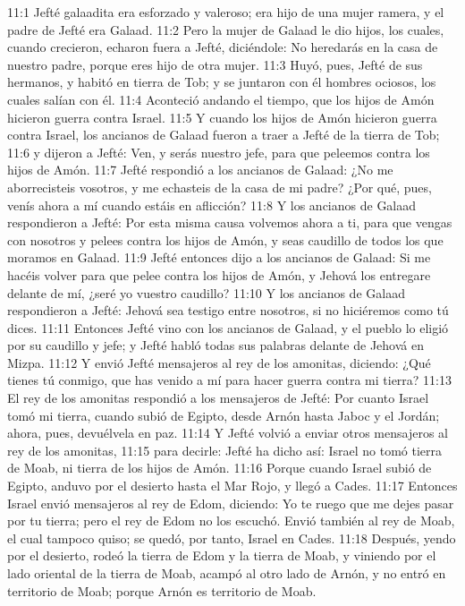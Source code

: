 11:1 Jefté galaadita era esforzado y valeroso; era hijo de una mujer ramera, y el padre de Jefté era Galaad.  
11:2 Pero la mujer de Galaad le dio hijos, los cuales, cuando crecieron, echaron fuera a Jefté, diciéndole: No heredarás en la casa de nuestro padre, porque eres hijo de otra mujer.  
11:3 Huyó, pues, Jefté de sus hermanos, y habitó en tierra de Tob; y se juntaron con él hombres ociosos, los cuales salían con él.  
11:4 Aconteció andando el tiempo, que los hijos de Amón hicieron guerra contra Israel.  
11:5 Y cuando los hijos de Amón hicieron guerra contra Israel, los ancianos de Galaad fueron a traer a Jefté de la tierra de Tob; 
11:6 y dijeron a Jefté: Ven, y serás nuestro jefe, para que peleemos contra los hijos de Amón.  
11:7 Jefté respondió a los ancianos de Galaad: ¿No me aborrecisteis vosotros, y me echasteis de la casa de mi padre? ¿Por qué, pues, venís ahora a mí cuando estáis en aflicción?  
11:8 Y los ancianos de Galaad respondieron a Jefté: Por esta misma causa volvemos ahora a ti, para que vengas con nosotros y pelees contra los hijos de Amón, y seas caudillo de todos los que moramos en Galaad.  
11:9 Jefté entonces dijo a los ancianos de Galaad: Si me hacéis volver para que pelee contra los hijos de Amón, y Jehová los entregare delante de mí, ¿seré yo vuestro caudillo?  
11:10 Y los ancianos de Galaad respondieron a Jefté: Jehová sea testigo entre nosotros, si no hiciéremos como tú dices.  
11:11 Entonces Jefté vino con los ancianos de Galaad, y el pueblo lo eligió por su caudillo y jefe; y Jefté habló todas sus palabras delante de Jehová en Mizpa.  
11:12 Y envió Jefté mensajeros al rey de los amonitas, diciendo: ¿Qué tienes tú conmigo, que has venido a mí para hacer guerra contra mi tierra?  
11:13 El rey de los amonitas respondió a los mensajeros de Jefté: Por cuanto Israel tomó mi tierra, cuando subió de Egipto, desde Arnón hasta Jaboc y el Jordán; ahora, pues, devuélvela en paz.  
11:14 Y Jefté volvió a enviar otros mensajeros al rey de los amonitas,  
11:15 para decirle: Jefté ha dicho así: Israel no tomó tierra de Moab, ni tierra de los hijos de Amón.  
11:16 Porque cuando Israel subió de Egipto, anduvo por el desierto hasta el Mar Rojo, y llegó a Cades.  
11:17 Entonces Israel envió mensajeros al rey de Edom, diciendo: Yo te ruego que me dejes pasar por tu tierra; pero el rey de Edom no los escuchó. Envió también al rey de Moab, el cual tampoco quiso; se quedó, por tanto, Israel en Cades.  
11:18 Después, yendo por el desierto, rodeó la tierra de Edom y la tierra de Moab, y viniendo por el lado oriental de la tierra de Moab, acampó al otro lado de Arnón, y no entró en territorio de Moab; porque Arnón es territorio de Moab.  
